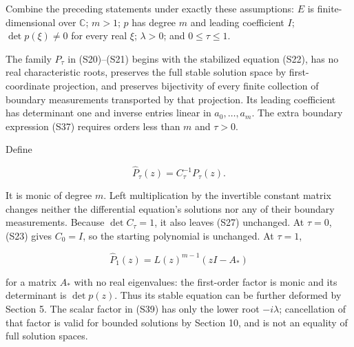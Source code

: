 \documentclass[
  11pt,
]{article}
\begin{document}
Combine the preceding statements under exactly these assumptions: \(E\)
is finite-dimensional over \(\mathbb C\); \(m>1\); \(p\) has degree
\(m\) and leading coefficient \(I\); \(\det p(\xi)\ne0\) for every real
\(\xi\); \(\lambda>0\); and \(0\leq\tau\leq1\).

The family \(P_\tau\) in (S20)--(S21) begins with the stabilized
equation (S22), has no real characteristic roots, preserves the full
stable solution space by first-coordinate projection, and preserves
bijectivity of every finite collection of boundary measurements
transported by that projection. Its leading coefficient has determinant
one and inverse entries linear in \(a_0,\ldots,a_m\). The extra boundary
expression (S37) requires orders less than \(m\) and \(\tau>0\).

Define

\[
\widehat P_\tau(z)=C_\tau^{-1}P_\tau(z).                  \tag{S38}
\]

It is monic of degree \(m\). Left multiplication by the invertible
constant matrix changes neither the differential equation's solutions
nor any of their boundary measurements. Because \(\det C_\tau=1\), it
also leaves (S27) unchanged. At \(\tau=0\), (S23) gives \(C_0=I\), so
the starting polynomial is unchanged. At \(\tau=1\),

\[
\widehat P_1(z)=L(z)^{m-1}(zI-A_*)                        \tag{S39}
\]

for a matrix \(A_*\) with no real eigenvalues: the first-order factor is
monic and its determinant is \(\det p(z)\). Thus its stable equation can
be further deformed by Section 5. The scalar factor in (S39) has only
the lower root \(-i\lambda\); cancellation of that factor is valid for
bounded solutions by Section 10, and is not an equality of full solution
spaces.
\end{document}
